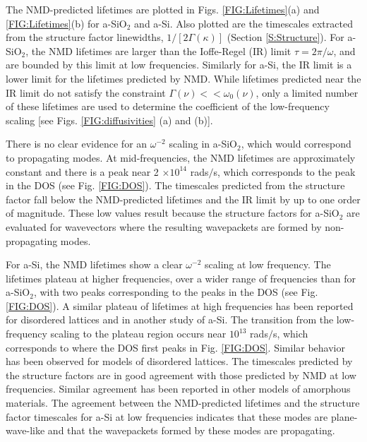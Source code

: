 \documentclass[aps,prb,onecolumn,preprint,superscriptaddress,footinbib,amsmath,amssymb,floatfix]{revtex4}
\begin{document}
The NMD-predicted lifetimes are plotted in Figs. 
\ref{FIG:Lifetimes}(a) and \ref{FIG:Lifetimes}(b) 
for a-SiO$_2$ and a-Si. 
Also plotted are the timescales extracted from the structure 
factor linewidths, $1/[2\Gamma(\kappa)]$ (Section \ref{S:Structure}). 
For a-SiO$_2$, the NMD lifetimes are larger than 
the Ioffe-Regel (IR) limit $\tau = 2\pi/\omega$,
\cite{taraskin_determination_1999} and are bounded by  
this limit at low frequencies. Similarly for a-Si, the IR limit is 
a lower limit for the lifetimes predicted by NMD. 
While lifetimes 
predicted near the IR limit do not satisfy the constraint 
$\Gamma(\nu) << \omega_0(\nu)$, only a limited number of these 
lifetimes are used to determine the coefficient of the low-frequency 
scaling [see Figs. \ref{FIG:diffusivities} (a) and (b)]. 

There is no clear evidence for an $\omega^{-2}$ scaling in a-SiO$_2$, 
which would correspond to propagating modes.  
At mid-frequencies, the NMD lifetimes are approximately constant and  
there is a peak near 2 $\times 10^{14}$ rads$/$s, which corresponds to 
the peak in the DOS (see Fig. \ref{FIG:DOS}). 
The timescales predicted from the 
structure factor fall below the NMD-predicted lifetimes 
and the IR limit by up to one order of magnitude. 
These low values result because the structure factors 
for a-SiO$_2$ are evaluated for wavevectors where the resulting 
wavepackets are formed by non-propagating modes.
\cite{feldman_thermal_1993,feldman_numerical_1999}

For a-Si, the NMD lifetimes show a clear $\omega^{-2}$ 
scaling at low frequency. 
The lifetimes plateau at higher frequencies,
over a wider range of frequencies than for a-SiO$_2$, with two peaks 
corresponding to the peaks in the DOS (see Fig. \ref{FIG:DOS}). 
A similar plateau of lifetimes at high frequencies has been 
reported for disordered lattices
\cite{sheng_heat_1991,larkin_predicting_2013} and in 
another study of a-Si.\cite{he_heat_2011} 
The transition from the low-frequency scaling to 
the plateau region occurs near 
$10^{13}$ rads$/$s, which corresponds to where the DOS first peaks 
in Fig. \ref{FIG:DOS}. 
Similar behavior has been observed for models of disordered lattices.
\cite{larkin_predicting_2013} The timescales predicted by the 
structure factors are in good agreement with those predicted by NMD 
at low frequencies. Similar agreement has been reported in other 
models of amorphous materials.
\cite{mazzacurati_low-frequency_1996,bickham_calculation_1998,
bickham_numerical_1999,feldman_numerical_1999} 
The agreement between the 
NMD-predicted lifetimes and the structure factor timescales for a-Si 
at low frequencies indicates that these modes are plane-wave-like 
and that the wavepackets formed by these modes are propagating.
\cite{feldman_thermal_1993,feldman_numerical_1999}
\end{document}
